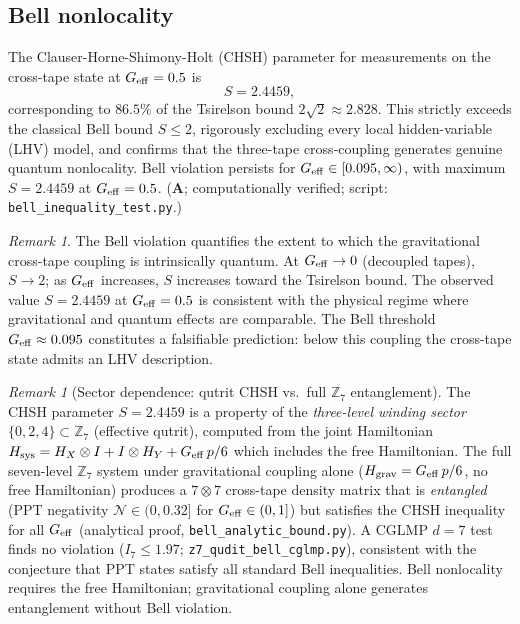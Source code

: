 \documentclass[11pt]{article}
\theoremstyle{remark}
\newtheorem{remark}[theorem]{Remark}
\newcommand{\CatA}{\textbf{A}}
\begin{document}
\subsection{Bell nonlocality}
\label{ssec:bell}

The Clauser-Horne-Shimony-Holt (CHSH) parameter for measurements on the cross-tape state at $G_{\rm eff} = 0.5$ is
\[
  S = 2.4459,
\]
corresponding to $86.5\%$ of the Tsirelson bound $2\sqrt{2} \approx 2.828$.
This strictly exceeds the classical Bell bound $S \le 2$, rigorously excluding
every local hidden-variable (LHV) model, and confirms that the three-tape
cross-coupling generates genuine quantum nonlocality. Bell violation persists for
$G_{\rm eff} \in [0.095, \infty)$, with maximum $S = 2.4459$ at $G_{\rm eff} = 0.5$.
($\CatA$; computationally verified; script: \texttt{bell\_inequality\_test.py}.)

\begin{remark}
The Bell violation quantifies the extent to which the gravitational cross-tape
coupling is intrinsically quantum. At $G_{\rm eff} \to 0$ (decoupled tapes),
$S\to 2$; as $G_{\rm eff}$ increases, $S$ increases toward the Tsirelson bound.
The observed value $S = 2.4459$ at $G_{\rm eff} = 0.5$ is consistent with the
physical regime where gravitational and quantum effects are comparable.
The Bell threshold $G_{\rm eff} \approx 0.095$ constitutes a falsifiable
prediction: below this coupling the cross-tape state admits an LHV description.
\end{remark}

\begin{remark}[Sector dependence: qutrit CHSH vs.\ full $\mathbb{Z}_7$ entanglement]
The CHSH parameter $S = 2.4459$ is a property of the \emph{three-level winding sector}
$\{0,2,4\}\subset\mathbb{Z}_7$ (effective qutrit), computed from the joint
Hamiltonian $H_{\rm sys} = H_X\otimes I + I\otimes H_Y + G_{\rm eff}\,p/6$
which includes the free Hamiltonian.
The full seven-level $\mathbb{Z}_7$ system under gravitational coupling alone
($H_{\rm grav} = G_{\rm eff}\,p/6$, no free Hamiltonian) produces a $7\otimes 7$
cross-tape density matrix that is \emph{entangled} (PPT negativity
$\mathcal{N}\in(0,0.32]$ for $G_{\rm eff}\in(0,1]$) but satisfies the CHSH
inequality for all $G_{\rm eff}$ (analytical proof, \texttt{bell\_analytic\_bound.py}).
A CGLMP $d=7$ test finds no violation ($I_7\leq 1.97$; \texttt{z7\_qudit\_bell\_cglmp.py}),
consistent with the conjecture that PPT states satisfy all standard Bell inequalities.
Bell nonlocality requires the free Hamiltonian; gravitational coupling alone generates
entanglement without Bell violation.
\end{remark}
\end{document}
